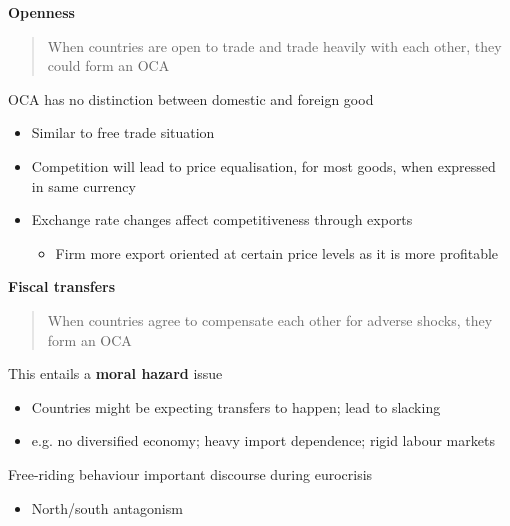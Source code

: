 \documentclass{beamer}
\begin{document}
\begin{frame}
  \textbf{Openness} 
  \begin{quote}
    When countries are open to trade and trade heavily with each other, they could form an OCA
  \end{quote}
  \medskip
   OCA has no distinction between domestic and foreign good 
  \begin{itemize}
    \item Similar to free trade situation
    \item Competition will lead to price equalisation, for most goods, when expressed in same currency
    \item Exchange rate changes affect competitiveness through exports
    \begin{itemize}
      \item Firm more export oriented at certain price levels as it is more profitable
    \end{itemize}    
  \end{itemize}
\end{frame}


\begin{frame}
  \textbf{Fiscal transfers} 
  \begin{quote}
    When countries agree to compensate each other for adverse shocks, they form an OCA
  \end{quote}
  \medskip
   This entails a \textbf{moral hazard} issue  
  \begin{itemize}
    \item Countries might be expecting transfers to happen; lead to slacking
    \item e.g. no diversified economy; heavy import dependence; rigid labour markets
  \end{itemize}
  \medskip
  Free-riding behaviour important discourse during eurocrisis
  \begin{itemize}
    \item North/south antagonism
  \end{itemize}
\end{frame}
\end{document}
